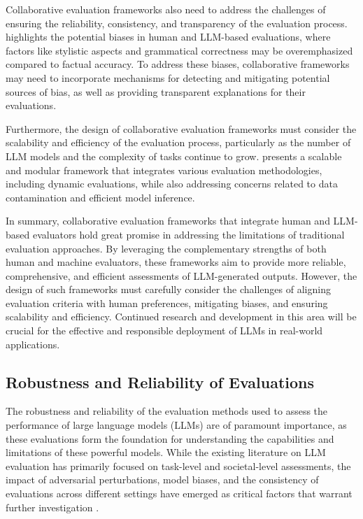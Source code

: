 \documentclass[11pt]{article}
\begin{document}
Collaborative evaluation frameworks also need to address the challenges of ensuring the reliability, consistency, and transparency of the evaluation process. \cite{ref130} highlights the potential biases in human and LLM-based evaluations, where factors like stylistic aspects and grammatical correctness may be overemphasized compared to factual accuracy. To address these biases, collaborative frameworks may need to incorporate mechanisms for detecting and mitigating potential sources of bias, as well as providing transparent explanations for their evaluations.

Furthermore, the design of collaborative evaluation frameworks must consider the scalability and efficiency of the evaluation process, particularly as the number of LLM models and the complexity of tasks continue to grow. \cite{ref76} presents a scalable and modular framework that integrates various evaluation methodologies, including dynamic evaluations, while also addressing concerns related to data contamination and efficient model inference.

In summary, collaborative evaluation frameworks that integrate human and LLM-based evaluators hold great promise in addressing the limitations of traditional evaluation approaches. By leveraging the complementary strengths of both human and machine evaluators, these frameworks aim to provide more reliable, comprehensive, and efficient assessments of LLM-generated outputs. However, the design of such frameworks must carefully consider the challenges of aligning evaluation criteria with human preferences, mitigating biases, and ensuring scalability and efficiency. Continued research and development in this area will be crucial for the effective and responsible deployment of LLMs in real-world applications.

\subsection{Robustness and Reliability of Evaluations}

The robustness and reliability of the evaluation methods used to assess the performance of large language models (LLMs) are of paramount importance, as these evaluations form the foundation for understanding the capabilities and limitations of these powerful models. While the existing literature on LLM evaluation has primarily focused on task-level and societal-level assessments, the impact of adversarial perturbations, model biases, and the consistency of evaluations across different settings have emerged as critical factors that warrant further investigation \cite{ref134}.
\end{document}
